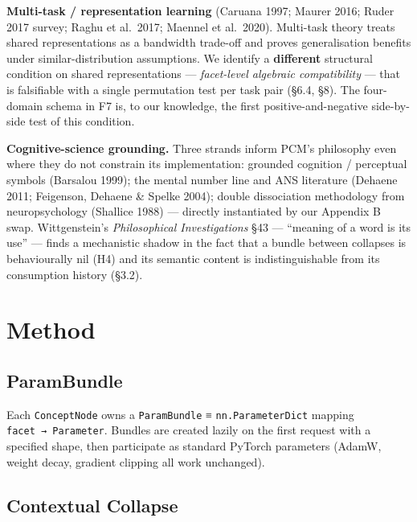 \textbf{Multi-task / representation learning} (Caruana 1997; Maurer
2016; Ruder 2017 survey; Raghu et al.~2017; Maennel et al.~2020).
Multi-task theory treats shared representations as a bandwidth
trade-off and proves generalisation benefits under
similar-distribution assumptions. We identify a \textbf{different}
structural condition on shared representations --- \emph{facet-level
algebraic compatibility} --- that is falsifiable with a single
permutation test per task pair (§6.4, §8). The four-domain schema
in F7 is, to our knowledge, the first positive-and-negative
side-by-side test of this condition.

\textbf{Cognitive-science grounding.} Three strands inform PCM's
philosophy even where they do not constrain its implementation:
grounded cognition / perceptual symbols (Barsalou 1999); the mental
number line and ANS literature (Dehaene 2011; Feigenson, Dehaene \&
Spelke 2004); double dissociation methodology from neuropsychology
(Shallice 1988) --- directly instantiated by our Appendix B swap.
Wittgenstein's \emph{Philosophical Investigations} §43 --- ``meaning of a
word is its use'' --- finds a mechanistic shadow in the fact that a
bundle between collapses is behaviourally nil (H4) and its semantic
content is indistinguishable from its consumption history (§3.2).

\medskip

\section{Method}

\subsection{ParamBundle}

Each \texttt{ConceptNode} owns a \texttt{ParamBundle} ≡ \texttt{nn.ParameterDict}
mapping \texttt{facet\ →\ Parameter}. Bundles are created lazily on the first
request with a specified shape, then participate as standard PyTorch
parameters (AdamW, weight decay, gradient clipping all work unchanged).

\subsection{Contextual Collapse}

\begin{Shaded}
\begin{Highlighting}[]
\OperatorTok{=}\OperatorTok{=}\OperatorTok{=}\NormalTok{,}
\OperatorTok{=}\NormalTok{(}\OperatorTok{=}\OperatorTok{=}\NormalTok{)}
\end{Highlighting}
\end{Shaded}

